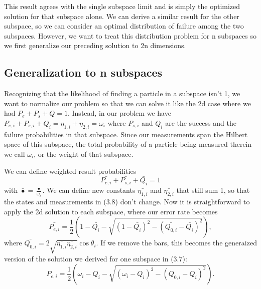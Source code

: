 \documentclass[12pt,oneside,english,reqno]{amsbook}
\numberwithin{section}{chapter}
\numberwithin{equation}{section}
\numberwithin{figure}{section}
\begin{document}
This result agrees with the single subspace limit and is simply the optimized solution for that subspace alone. We can derive a similar result for the other subspace, so we can consider an optimal distribution of failure among the two subspaces.  However, we want to treat this distribution problem for n subspaces so we first generalize our preceding solution to 2n dimensions.

\subsection{Generalization to n subspaces}

Recognizing that the likelihood of finding a particle in a subspace isn't 1, we want to normalize our problem so that we can solve it like the 2d case where we had $P_e+ P_s+ Q= 1.$ Instead, in our problem we have $P_{e,i} + P_{s,i} + Q_i = \eta_{1,i} + \eta_{2,i} = \omega_i$ where $P_{s,i}$ and $Q_i$ are the success and the failure probabilities in that subspace.  Since our measurements span the Hilbert space of this subspace, the total probability of a particle being measured therein we call $\omega_i$, or the weight of that subspace.

We can define weighted result probabilities
\begin{equation} \bar{P_{e,i}} +\bar{P_{s,i}} + \bar{Q_i} = 1 \end{equation}
with $ \bar{\bullet} = \frac{\bullet}{\omega_i} $. We can define new constants $\bar{\eta_{1,i}} $ and $ \bar{\eta_{2,i}}$ that still sum 1, so that the states and measurements in (3.8) don't change.  Now it is straightforward to apply the 2d solution to each subspace, where our error rate becomes
\[\bar{P_{e,i}} = \frac{1}{2}( 1-\bar{Q_i} - \sqrt{(1-\bar{Q_i})^2 - (\bar{Q_{0,i}} -\bar{ Q_i})^2}),\]
where $\bar{Q_{0,i}} = 2 \sqrt{\bar{\eta_{1,i}}\bar{\eta_{2,i}}}\cos\theta_i.$
If we remove the bars, this becomes the generaized version of the solution we derived for one subspace in (3.7):
\begin{equation}P_{e,i}= \frac{1}{2}( \omega_i-Q_i - \sqrt{(\omega_i-Q_i)^2 - (Q_{0,i} - Q_i)^2}).\end{equation}

\end{document}
